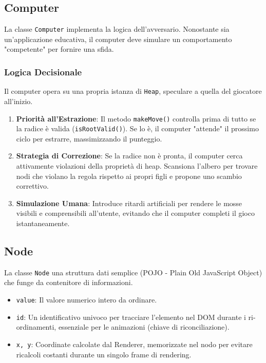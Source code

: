 \documentclass[openany]{theme/uniprthesis}
\begin{document}
\subsection{Computer}
La classe \texttt{Computer} implementa la logica dell'avversario. Nonostante sia un'applicazione educativa, il computer deve simulare un comportamento "competente" per fornire una sfida.

\subsubsection*{Logica Decisionale}
Il computer opera su una propria istanza di \texttt{Heap}, speculare a quella del giocatore all'inizio.
\begin{enumerate}
    \item \textbf{Priorità all'Estrazione}: Il metodo \texttt{makeMove()} controlla prima di tutto se la radice è valida (\texttt{isRootValid()}). Se lo è, il computer "attende" il prossimo ciclo per estrarre, massimizzando il punteggio.
    \item \textbf{Strategia di Correzione}: Se la radice non è pronta, il computer cerca attivamente violazioni della proprietà di heap. Scansiona l'albero per trovare nodi che violano la regola rispetto ai propri figli e propone uno scambio correttivo.
    \item \textbf{Simulazione Umana}: Introduce ritardi artificiali per rendere le mosse visibili e comprensibili all'utente, evitando che il computer completi il gioco istantaneamente.
\end{enumerate}

\subsection{Node}
La classe \texttt{Node}  una struttura dati semplice (POJO - Plain Old JavaScript Object) che funge da contenitore di informazioni.
\begin{itemize}
    \item \texttt{value}: Il valore numerico intero da ordinare.
    \item \texttt{id}: Un identificativo univoco per tracciare l'elemento nel DOM durante i ri-ordinamenti, essenziale per le animazioni (chiave di riconciliazione).
    \item \texttt{x, y}: Coordinate calcolate dal Renderer, memorizzate nel nodo per evitare ricalcoli costanti durante un singolo frame di rendering.
\end{itemize}
\end{document}
